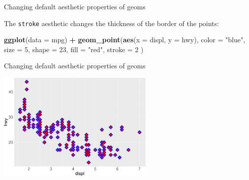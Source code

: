 \documentclass[ignorenonframetext,]{beamer}
\newenvironment{Shaded}{\begin{snugshade}}{\end{snugshade}}
\newcommand{\DataTypeTok}[1]{\textcolor[rgb]{0.13,0.29,0.53}{#1}}
\newcommand{\DecValTok}[1]{\textcolor[rgb]{0.00,0.00,0.81}{#1}}
\newcommand{\KeywordTok}[1]{\textcolor[rgb]{0.13,0.29,0.53}{\textbf{#1}}}
\newcommand{\NormalTok}[1]{#1}
\newcommand{\OperatorTok}[1]{\textcolor[rgb]{0.81,0.36,0.00}{\textbf{#1}}}
\newcommand{\StringTok}[1]{\textcolor[rgb]{0.31,0.60,0.02}{#1}}
\begin{document}
\begin{frame}[fragile]{Changing default aesthetic properties of geoms}
\protect\hypertarget{changing-default-aesthetic-properties-of-geoms-10}{}

The \texttt{stroke} aesthetic changes the thickness of the border of the
points:

\begin{Shaded}
\begin{Highlighting}[]
\KeywordTok{ggplot}\NormalTok{(}\DataTypeTok{data =}\NormalTok{ mpg) }\OperatorTok{+}
\StringTok{  }\KeywordTok{geom_point}\NormalTok{(}\KeywordTok{aes}\NormalTok{(}\DataTypeTok{x =}\NormalTok{ displ, }\DataTypeTok{y =}\NormalTok{ hwy),}
    \DataTypeTok{color =} \StringTok{"blue"}\NormalTok{,}
    \DataTypeTok{size =} \DecValTok{5}\NormalTok{,}
    \DataTypeTok{shape =} \DecValTok{23}\NormalTok{,}
    \DataTypeTok{fill =} \StringTok{"red"}\NormalTok{,}
    \DataTypeTok{stroke =} \DecValTok{2}
\NormalTok{  )}
\end{Highlighting}
\end{Shaded}

\end{frame}

\begin{frame}{Changing default aesthetic properties of geoms}
\protect\hypertarget{changing-default-aesthetic-properties-of-geoms-11}{}

\begin{center}\includegraphics[height=200px]{data-visualization_files/figure-beamer/unnamed-chunk-47-1} \end{center}

\end{frame}
\end{document}
